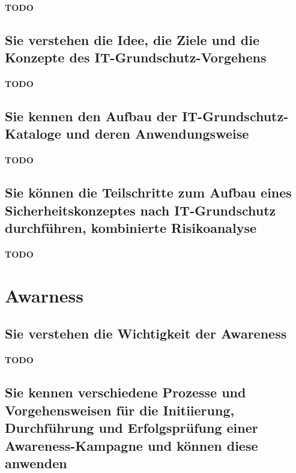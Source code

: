 \documentclass[10pt,a4paper]{article}
\begin{document}
\paragraph*{TODO}

\subsection*{Sie verstehen die Idee, die Ziele und die Konzepte des IT-Grundschutz-Vorgehens}
\paragraph*{TODO}

\subsection*{Sie kennen den Aufbau der IT-Grundschutz-Kataloge und deren Anwendungsweise}
\paragraph*{TODO}

\subsection*{Sie können die Teilschritte zum Aufbau eines Sicherheitskonzeptes nach IT-Grundschutz durchführen, kombinierte Risikoanalyse}
\paragraph*{TODO}


\section{Awarness}
\subsection*{Sie verstehen die Wichtigkeit der \flqq Awareness \frqq}
\paragraph*{TODO}

\subsection*{Sie kennen verschiedene Prozesse und Vorgehensweisen für die Initiierung, Durchführung und Erfolgsprüfung einer Awareness-Kampagne und können diese anwenden}
\end{document}
